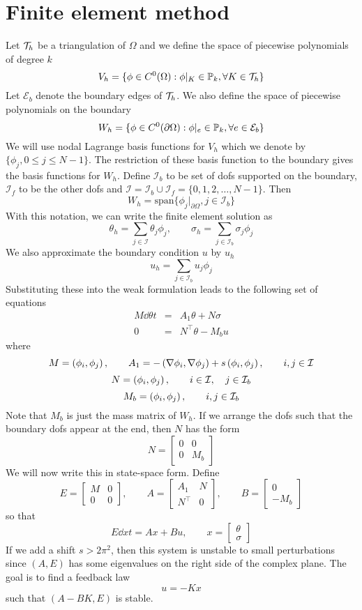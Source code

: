 \documentclass[11pt, oneside]{article}   	%
\newcommand{\bedge}{\mathcal{E}_b}
\newcommand{\ind}{\mathcal{I}}
\newcommand{\bind}{\ind_b}
\newcommand{\find}{\ind_f}
\begin{document}
\section{Finite element method}
Let $\mathcal{T}_h$ be a triangulation of $\Omega$ and we define the space of piecewise polynomials of degree $k$
\[
V_h = \{ \phi \in C^0(\Omega): \phi|_K \in \mathbb{P}_k, \forall K \in \mathcal{T}_h \}
\]
Let $\bedge$ denote the boundary edges of $\mathcal{T}_h$. We also define the space of piecewise polynomials on the boundary
\[
W_h = \{ \phi \in C^0(\partial\Omega): \phi|_e \in \poly_k, \forall e \in \bedge \}
\] 
We will use nodal Lagrange basis functions for $V_h$ which we denote by $\{ \phi_j, 0 \le j \le N-1\}$. The restriction of these basis function to the boundary gives the basis functions for $W_h$. Define $\bind$ to be set of dofs supported on the boundary, $\find$ to be the other dofs and $\ind = \bind \cup \find = \{0,1,2,\ldots,N-1\}$. Then
\[
W_h = \textrm{span}\{ \phi_j|_{\partial\Omega}, j \in \bind \}
\]
With this notation, we can write the finite element solution as
\[
\theta_h = \sum_{j \in \ind} \theta_j \phi_j, \qquad \sigma_h = \sum_{j \in \bind} \sigma_j \phi_j
\]
We also approximate the boundary condition $u$ by $u_h$
\[
u_h = \sum_{j \in \bind} u_j \phi_j
\]
Substituting these into the weak formulation leads to the following set of equations
\begin{eqnarray*}
M \dd{\theta}{t} &=& A_1 \theta + N \sigma \\
0 &=& N^\top \theta - M_b u
\end{eqnarray*}
where
\[
M = \ip{\phi_i, \phi_j}, \qquad A_1 = -\ip{\nabla\phi_i, \nabla\phi_j} + s\ip{\phi_i,\phi_j}, \qquad i,j \in \ind
\]
\[
N = \ip{\phi_i, \phi_j}, \qquad i \in \ind, \quad j \in \bind
\]
\[
M_b = \ip{\phi_i,\phi_j}, \qquad i,j \in \bind
\]
Note that $M_b$ is just the mass matrix of $W_h$. If we arrange the dofs such that the boundary dofs appear at the end, then $N$ has the form
\[
N = \begin{bmatrix}
0 & 0 \\
0 & M_b \end{bmatrix}
\]
We will now write this in state-space form. Define
\[
E = \begin{bmatrix}
M & 0 \\
0 & 0 \end{bmatrix}, \qquad A = \begin{bmatrix}
A_1 & N \\
N^\top & 0 \end{bmatrix}, \qquad B = \begin{bmatrix}
0 \\
-M_b \end{bmatrix}
\]
so that
\[
E \dd{x}{t} = Ax + Bu, \qquad x = \begin{bmatrix} \theta \\ \sigma \end{bmatrix}
\]
If we add a shift $s > 2 \pi^2$, then this system is unstable to small perturbations since $(A,E)$ has some eigenvalues on the right side of the complex plane. The goal is to find a feedback law
\[
u = -K x
\]
such that $(A-BK, E)$ is stable.
\end{document}
